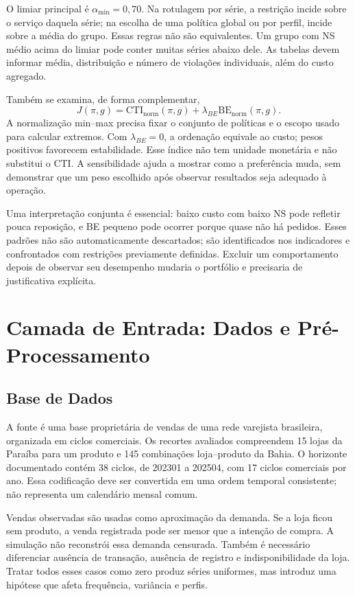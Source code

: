 O limiar principal é $\alpha_{\min}=0{,}70$. Na rotulagem por série, a restrição incide sobre o serviço daquela série; na escolha de uma política global ou por perfil, incide sobre a média do grupo. Essas regras não são equivalentes. Um grupo com NS médio acima do limiar pode conter muitas séries abaixo dele. As tabelas devem informar média, distribuição e número de violações individuais, além do custo agregado.

Também se examina, de forma complementar,
\[
J(\pi,g)=\mathrm{CTI}_{\mathrm{norm}}(\pi,g)+\lambda_{BE}\mathrm{BE}_{\mathrm{norm}}(\pi,g).
\]
A normalização min--max precisa fixar o conjunto de políticas e o escopo usado para calcular extremos. Com $\lambda_{BE}=0$, a ordenação equivale ao custo; pesos positivos favorecem estabilidade. Esse índice não tem unidade monetária e não substitui o CTI. A sensibilidade ajuda a mostrar como a preferência muda, sem demonstrar que um peso escolhido após observar resultados seja adequado à operação.

Uma interpretação conjunta é essencial: baixo custo com baixo NS pode refletir pouca reposição, e BE pequeno pode ocorrer porque quase não há pedidos. Esses padrões não são automaticamente descartados; são identificados nos indicadores e confrontados com restrições previamente definidas. Excluir um comportamento depois de observar seu desempenho mudaria o portfólio e precisaria de justificativa explícita.

\section{Camada de Entrada: Dados e Pré-Processamento}
\subsection{Base de Dados}

A fonte é uma base proprietária de vendas de uma rede varejista brasileira, organizada em ciclos comerciais. Os recortes avaliados compreendem 15 lojas da Paraíba para um produto e 145 combinações loja--produto da Bahia. O horizonte documentado contém 38 ciclos, de 202301 a 202504, com 17 ciclos comerciais por ano. Essa codificação deve ser convertida em uma ordem temporal consistente; não representa um calendário mensal comum.

Vendas observadas são usadas como aproximação da demanda. Se a loja ficou sem produto, a venda registrada pode ser menor que a intenção de compra. A simulação não reconstrói essa demanda censurada. Também é necessário diferenciar ausência de transação, ausência de registro e indisponibilidade da loja. Tratar todos esses casos como zero produz séries uniformes, mas introduz uma hipótese que afeta frequência, variância e perfis.

